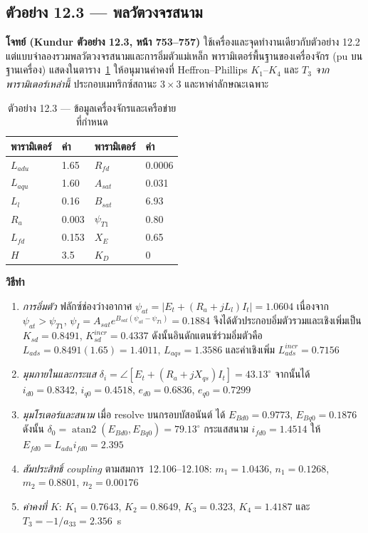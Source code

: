\documentclass[12pt,a4paper]{article}
\begin{document}
\subsection{ตัวอย่าง 12.3 --- พลวัตวงจรสนาม}

\textbf{โจทย์ (Kundur ตัวอย่าง 12.3, หน้า 753--757)}
ใช้เครื่องและจุดทำงานเดียวกับตัวอย่าง 12.2 แต่แบบจำลองรวมพลวัตวงจรสนามและการอิ่มตัวแม่เหล็ก
พารามิเตอร์พื้นฐานของเครื่องจักร (pu บนฐานเครื่อง) แสดงในตาราง~\ref{tab:Bgiven}
ให้อนุมานค่าคงที่ Heffron--Phillips $K_1$--$K_4$ และ $T_3$
\emph{จากพารามิเตอร์เหล่านี้} ประกอบเมทริกซ์สถานะ $3\times3$
และหาค่าลักษณะเฉพาะ

\begin{table}[H]
\centering
\caption{ตัวอย่าง 12.3 --- ข้อมูลเครื่องจักรและเครือข่ายที่กำหนด}
\label{tab:Bgiven}
\begin{tabular}{@{}llll@{}}
\toprule
พารามิเตอร์ & ค่า & พารามิเตอร์ & ค่า \\
\midrule
$L_{adu}$ & 1.65 & $R_{fd}$  & 0.0006 \\
$L_{aqu}$ & 1.60 & $A_{sat}$ & 0.031 \\
$L_l$     & 0.16 & $B_{sat}$ & 6.93 \\
$R_a$     & 0.003 & $\psi_{T1}$ & 0.80 \\
$L_{fd}$  & 0.153 & $X_E$ & 0.65 \\
$H$       & 3.5 & $K_D$ & 0 \\
\bottomrule
\end{tabular}
\end{table}
\newpage
\textbf{วิธีทำ}
\begin{enumerate}
\item \textit{การอิ่มตัว}
      ฟลักซ์ช่องว่างอากาศ $\psi_{at} = |E_t + (R_a + jL_l)I_t| = 1.0604$
      เนื่องจาก $\psi_{at}>\psi_{T1}$,
      $\psi_I = A_{sat}e^{B_{sat}(\psi_{at}-\psi_{T1})} = 0.1884$
      จึงได้ตัวประกอบอิ่มตัวรวมและเชิงเพิ่มเป็น $K_{sd}=0.8491$,
      $K_{sd}^{incr}=0.4337$
      ดังนั้นอินดักแตนซ์ร่วมอิ่มตัวคือ $L_{ads}=0.8491(1.65)=1.4011$,
      $L_{aqs}=1.3586$ และค่าเชิงเพิ่ม $L_{ads}^{incr}=0.7156$
\item \textit{มุมภายในและกระแส}
      $\delta_i = \angle\!\left[E_t + (R_a + jX_{qs})I_t\right] = 43.13^\circ$
      จากนั้นได้ $i_{d0}=0.8342$, $i_{q0}=0.4518$, $e_{d0}=0.6836$,
      $e_{q0}=0.7299$
\item \textit{มุมโรเตอร์และสนาม}
      เมื่อ resolve บนกรอบบัสอนันต์ ได้ $E_{Bd0}=0.9773$, $E_{Bq0}=0.1876$
      ดังนั้น $\delta_0 = \operatorname{atan2}(E_{Bd0},E_{Bq0}) = 79.13^\circ$
      กระแสสนาม $i_{fd0}=1.4514$ ให้ $E_{fd0}=L_{adu}i_{fd0}=2.395$
\item \textit{สัมประสิทธิ์ coupling} ตามสมการ~12.106--12.108:
      $m_1 = 1.0436$, $n_1 = 0.1268$, $m_2 = 0.8801$, $n_2 = 0.00176$
\item \textit{ค่าคงที่ $K$}:
      $K_1 = 0.7643$, $K_2 = 0.8649$, $K_3 = 0.323$,
      $K_4 = 1.4187$ และ $T_3 = -1/a_{33} = 2.356$~s
\end{enumerate}
\end{document}

